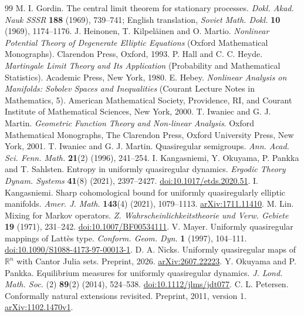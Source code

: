 \documentclass[10pt,a4paper]{amsart}
\numberwithin{equation}{section}
\begin{document}
\begin{thebibliography}{99}
 M. I. Gordin. The central limit theorem for stationary processes. \emph{Dokl. Akad. Nauk SSSR} \textbf{188} (1969), 739--741; English translation, \emph{Soviet Math. Dokl.} \textbf{10} (1969), 1174--1176.
 J. Heinonen, T. Kilpel\"ainen and O. Martio. \emph{Nonlinear Potential Theory of Degenerate Elliptic Equations} (Oxford Mathematical Monographs). Clarendon Press, Oxford, 1993.
 P. Hall and C. C. Heyde. \emph{Martingale Limit Theory and Its Application} (Probability and Mathematical Statistics). Academic Press, New York, 1980.
 E. Hebey. \emph{Nonlinear Analysis on Manifolds: Sobolev Spaces and Inequalities} (Courant Lecture Notes in Mathematics, 5). American Mathematical Society, Providence, RI, and Courant Institute of Mathematical Sciences, New York, 2000.
 T. Iwaniec and G. J. Martin. \emph{Geometric Function Theory and Non-linear Analysis}. Oxford Mathematical Monographs, The Clarendon Press, Oxford University Press, New York, 2001.
 T. Iwaniec and G. J. Martin. Quasiregular semigroups. \emph{Ann. Acad. Sci. Fenn. Math.} \textbf{21}(2) (1996), 241--254.
 I. Kangasniemi, Y. Okuyama, P. Pankka and T. Sahlsten. Entropy in uniformly quasiregular dynamics. \emph{Ergodic Theory Dynam. Systems} \textbf{41}(8) (2021), 2397--2427. \href{https://doi.org/10.1017/etds.2020.51}{doi:10.1017/etds.2020.51}.
 I. Kangasniemi. Sharp cohomological bound for uniformly quasiregularly elliptic manifolds. \emph{Amer. J. Math.} \textbf{143}(4) (2021), 1079--1113. \href{https://arxiv.org/abs/1711.11410}{arXiv:1711.11410}.
 M. Lin. Mixing for Markov operators. \emph{Z. Wahrscheinlichkeitstheorie und Verw. Gebiete} \textbf{19} (1971), 231--242. \href{https://doi.org/10.1007/BF00534111}{doi:10.1007/BF00534111}.
 V. Mayer. Uniformly quasiregular mappings of Latt\`es type. \emph{Conform. Geom. Dyn.} \textbf{1} (1997), 104--111. \href{https://doi.org/10.1090/S1088-4173-97-00013-1}{doi:10.1090/S1088-4173-97-00013-1}.
 D. A. Nicks. Uniformly quasiregular maps of $\mathbb{R}^n$ with Cantor Julia sets. Preprint, 2026. \href{https://arxiv.org/abs/2607.22223}{arXiv:2607.22223}.
 Y. Okuyama and P. Pankka. Equilibrium measures for uniformly quasiregular dynamics. \emph{J. Lond. Math. Soc.} (2) \textbf{89}(2) (2014), 524--538. \href{https://doi.org/10.1112/jlms/jdt077}{doi:10.1112/jlms/jdt077}.
 C. L. Petersen. Conformally natural extensions revisited. Preprint, 2011, version 1. \href{https://arxiv.org/abs/1102.1470v1}{arXiv:1102.1470v1}.

\end{thebibliography}
\end{document}
